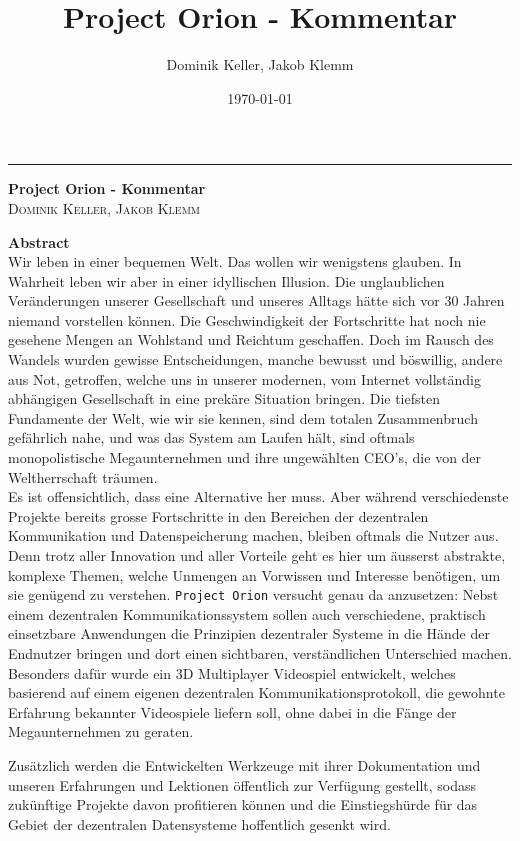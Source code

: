 \documentclass[a4paper,11pt,titlepage,twoside]{memoir}
\author{Dominik Keller, Jakob Klemm}
\date{\today}
\title{Project Orion - Kommentar}
\begin{document}
\thispagestyle{empty} 
\begin{titlepage} 
\raggedleft 
\rule{1pt}{\textheight} 
\hspace{0.05\textwidth} 
\parbox[b]{0.75\textwidth}{ 
{\Huge\bfseries Project Orion - Kommentar }\\[2\baselineskip] 
{\Large\textsc{ Dominik Keller, Jakob Klemm }} 
\vspace{0.5\textheight} 
} 
\end{titlepage} 
\newpage 
\tableofcontents

\newpage  
\begin{ABSTRACT}
\textbf{Abstract}\\
\noindent Wir leben in einer bequemen Welt. Das wollen wir wenigstens
glauben. In Wahrheit leben wir aber in einer idyllischen Illusion. Die
unglaublichen Veränderungen unserer Gesellschaft und unseres Alltags
hätte sich vor 30 Jahren niemand vorstellen können. Die
Geschwindigkeit der Fortschritte hat noch nie gesehene Mengen an
Wohlstand und Reichtum geschaffen. Doch im Rausch des Wandels wurden
gewisse Entscheidungen, manche bewusst und böswillig, andere aus Not,
getroffen, welche uns in unserer modernen, vom Internet vollständig
abhängigen Gesellschaft in eine prekäre Situation bringen. Die
tiefsten Fundamente der Welt, wie wir sie kennen, sind dem totalen
Zusammenbruch gefährlich nahe, und was das System am Laufen hält, sind
oftmals monopolistische Megaunternehmen und ihre ungewählten CEO's,
die von der Weltherrschaft träumen.\\

\noindent Es ist offensichtlich, dass eine Alternative her muss. Aber
während verschiedenste Projekte bereits grosse Fortschritte in den
Bereichen der dezentralen Kommunikation und Datenspeicherung machen,
bleiben oftmals die Nutzer aus. Denn trotz aller Innovation und aller
Vorteile geht es hier um äusserst abstrakte, komplexe Themen, welche
Unmengen an Vorwissen und Interesse benötigen, um sie genügend zu
verstehen. \texttt{Project Orion} versucht genau da anzusetzen: Nebst einem
dezentralen Kommunikationssystem sollen auch verschiedene, praktisch
einsetzbare Anwendungen die Prinzipien dezentraler Systeme in die
Hände der Endnutzer bringen und dort einen sichtbaren, verständlichen
Unterschied machen. Besonders dafür wurde ein 3D Multiplayer
Videospiel entwickelt, welches basierend auf einem eigenen dezentralen
Kommunikationsprotokoll, die gewohnte Erfahrung bekannter Videospiele
liefern soll, ohne dabei in die Fänge der Megaunternehmen zu geraten.

\noindent Zusätzlich werden die Entwickelten Werkzeuge mit ihrer
Dokumentation und unseren Erfahrungen und Lektionen öffentlich zur
Verfügung gestellt, sodass zukünftige Projekte davon profitieren
können und die Einstiegshürde für das Gebiet der dezentralen
Datensysteme hoffentlich gesenkt wird.
\end{ABSTRACT}
\newpage
\end{document}
